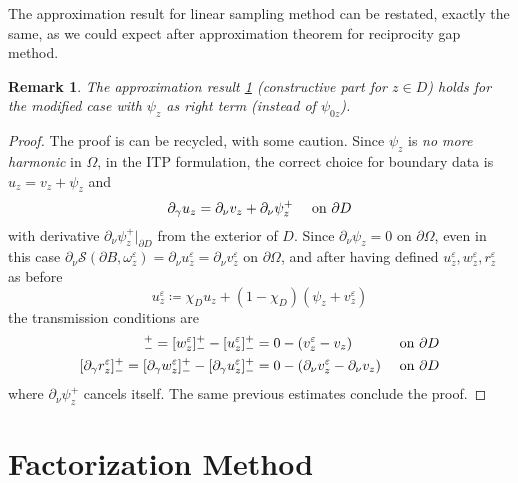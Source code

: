 \documentclass[10pt, a4paper, twoside, openright]{book}
\theoremstyle{definition}
\theoremstyle{plain}
\theoremstyle{plain}
\theoremstyle{plain}
\theoremstyle{plain}
\newtheorem{remark}[subsection]{Remark}
\theoremstyle{plain}
\theoremstyle{plain}
\theoremstyle{plain}
\theoremstyle{plain}
\let\epsilon\varepsilon
\begin{document}
The approximation result for linear sampling method can be restated, exactly the same, as we could expect after approximation theorem for reciprocity gap method.

\begin{remark}
 The approximation result \ref{} (constructive part for $z \in D$) holds for the modified case with $\psi_z$ as right term (instead of $\psi_{0z}$).
\end{remark}
\begin{proof}
 The proof is can be recycled, with some caution.
 Since $\psi_z$ is \emph{no more harmonic} in $\Omega$, in the ITP formulation, the correct choice for boundary data is $u_z = v_z + \psi_z$ and
 \begin{equation}
 \partial_\gamma u_z = \partial_\nu v_z + \partial_\nu\psi_z^+ \quad \textup{ on }\partial D
 \end{equation}
 with derivative $\partial_\nu\psi_z^+|_{\partial D}$ from the exterior of $D$. Since $\partial_\nu\psi_z = 0$ on $\partial \Omega$, even in this case $\partial_\nu\mathcal{S}(\partial B, \omega^\epsilon_z) = \partial_\nu u^\epsilon_z = \partial_\nu v^\epsilon_z$ on $\partial \Omega$, 
 and after having defined $u^\epsilon_z, w^\epsilon_z, r^\epsilon_z$ as before
 \begin{equation}
   u^\epsilon_z\coloneqq\chi_Du_z + (1-\chi_D)(\psi_{z} + v^\epsilon_z) 
 \end{equation}
 the transmission conditions are
  \begin{align}
   [r^\epsilon_z]^+_- = [w^\epsilon_z]^+_- -[u^\epsilon_z]^+_- &=0 - (v^\epsilon_z - v_z) && \textup{ on }\partial D \\
   [\partial_\gamma r^\epsilon_z]^+_- = [\partial_\gamma w^\epsilon_z]^+_- -[\partial_\gamma u^\epsilon_z]^+_-&= 0 - (\partial_\nu v^\epsilon_z - \partial_\nu v_z) && \textup{ on }\partial D 
  \end{align}
  where $\partial_\nu\psi_z^+$ cancels itself. The same previous estimates conclude the proof.
\end{proof}

\section{Factorization Method}
\end{document}
